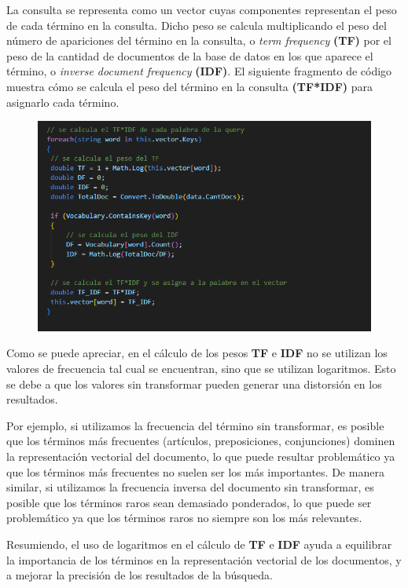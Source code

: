 \documentclass[12pt, letterpaper]{article}
\begin{document}
        La consulta se representa como un vector cuyas componentes representan el peso de cada término en la consulta. Dicho peso se calcula multiplicando el peso del número de apariciones del término en la consulta, o \textit{term frequency} \textbf{(TF)} por el peso de la cantidad de documentos de la base de datos en los que aparece el término, o \textit{inverse document frequency} \textbf{(IDF)}. El siguiente fragmento de código muestra cómo se calcula el peso del término en la consulta \textbf{(TF*IDF)} para asignarlo cada término.
        
        \newpage
        \begin{figure}[t]
            \centering
            \includegraphics[width=12cm]{./img/tfidf.png}
        \end{figure}
        
        Como se puede apreciar, en el cálculo de los pesos \textbf{TF} e \textbf{IDF} no se utilizan los valores de frecuencia tal cual se encuentran, sino que se utilizan logaritmos. Esto se debe a que los valores sin transformar pueden generar una distorsión en los resultados.
        
        Por ejemplo, si utilizamos la frecuencia del término sin transformar, es posible que los términos más frecuentes (artículos, preposiciones, conjunciones) dominen la representación vectorial del documento, lo que puede resultar problemático ya que los términos más frecuentes no suelen ser los más importantes.  De manera similar, si utilizamos la frecuencia inversa del documento sin transformar, es posible que los términos raros sean demasiado ponderados, lo que puede ser problemático ya que los términos raros no siempre son los más relevantes.
        
        Resumiendo, el uso de logaritmos en el cálculo de \textbf{TF} e \textbf{IDF} ayuda a equilibrar la importancia de los términos en la representación vectorial de los documentos, y a mejorar la precisión de los resultados de la búsqueda.
        
\end{document}
